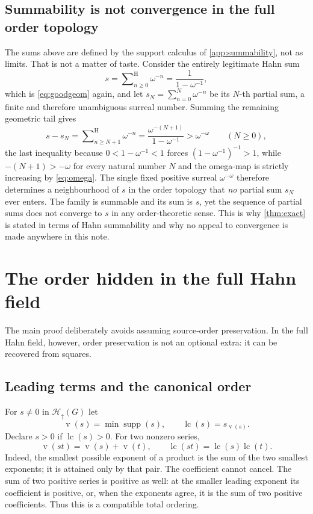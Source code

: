 \documentclass[11pt,letterpaper]{article}
\theoremstyle{definition}
\theoremstyle{remark}
\newcommand{\Hu}[1]{\mathcal H_{\uparrow}(#1)}
\newcommand{\supp}{\operatorname{supp}}
\newcommand{\lc}{\operatorname{lc}}
\newcommand{\vexp}{\operatorname{v}}
\newcommand{\seqsum}{\mathop{\sum}\nolimits^{\mathrm H}}
\begin{document}
\subsection{Summability is not convergence in the full order topology}\label{sec:notlimit}
The sums above are defined by the support calculus of
\cref{app:summability}, not as limits. That is not a matter of taste. Consider
the entirely legitimate Hahn sum
\[
 s=\seqsum_{n\ge0}\omega^{-n}=\frac{1}{1-\omega^{-1}},
\]
which is \eqref{eq:goodgeom} again, and let $s_N=\sum_{n=0}^{N}\omega^{-n}$ be
its $N$-th partial sum, a finite and therefore unambiguous surreal number.
Summing the remaining geometric tail gives
\[
 s-s_N=\seqsum_{n\ge N+1}\omega^{-n}
      =\frac{\omega^{-(N+1)}}{1-\omega^{-1}}
      >\omega^{-\omega}\qquad(N\ge0),
\]
the last inequality because $0<1-\omega^{-1}<1$ forces
$(1-\omega^{-1})^{-1}>1$, while $-(N+1)>-\omega$ for every natural number $N$
and the omega-map is strictly increasing by \eqref{eq:omega}. The single fixed positive
surreal $\omega^{-\omega}$ therefore determines a neighbourhood of $s$ in the
order topology that \emph{no} partial sum $s_N$ ever enters. The family is
summable and its sum is $s$, yet the sequence of partial sums does not
converge to $s$ in any order-theoretic sense. This is why
\cref{thm:exact} is stated in terms of Hahn summability and why no appeal to
convergence is made anywhere in this note.

\section{The order hidden in the full Hahn field}\label{sec:order}
The main proof deliberately avoids assuming source-order preservation. In the
full Hahn field, however, order preservation is not an optional extra: it can
be recovered from squares.

\subsection{Leading terms and the canonical order}
For $s\ne0$ in $\Hu{G}$ let
\[
 \vexp(s)=\min\supp(s),\qquad \lc(s)=s_{\vexp(s)}.
\]
Declare $s>0$ if $\lc(s)>0$. For two nonzero series,
\begin{equation}\label{eq:lead}
 \vexp(st)=\vexp(s)+\vexp(t),\qquad
 \lc(st)=\lc(s)\lc(t).
\end{equation}
Indeed, the smallest possible exponent of a product is the sum of the two
smallest exponents; it is attained only by that pair. The coefficient cannot
cancel. The sum of two positive series is positive as well: at the smaller
leading exponent its coefficient is positive, or, when the exponents agree,
it is the sum of two positive coefficients. Thus this is a compatible total
ordering.
\end{document}
